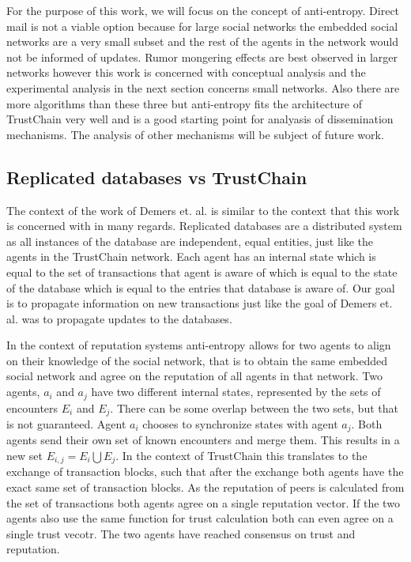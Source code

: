 For the purpose of this work, we will focus on the concept of anti-entropy. Direct mail is not a
viable option because for large social networks the embedded social networks are a very small 
subset and the rest of the agents in the network would not be informed of updates. Rumor mongering 
effects are best observed in larger networks however this work is concerned with conceptual analysis
and the experimental analysis in the next section concerns small networks. Also there are more 
algorithms than these three but anti-entropy fits the architecture of TrustChain very well and is 
a good starting point for analyasis of dissemination mechanisms. The analysis of other mechanisms
will be subject of future work.

\subsection{Replicated databases vs TrustChain}
The context of the work of Demers et. al. is similar to the context that this work is concerned with
in many regards. Replicated databases are a distributed system as all instances of the database are
independent, equal entities, just like the agents in the TrustChain network. Each agent has an 
internal state which is equal to the set of transactions that agent is aware of which is equal to
the state of the database which is equal to the entries that database is aware of. Our goal is to 
propagate information on new transactions just like the goal of Demers et. al. was to propagate 
updates to the databases. 

In the context of reputation systems anti-entropy allows for two agents to align on their knowledge
of the social network, that is to obtain the same embedded social network and agree on the reputation
of all agents in that network.
Two agents, $a_i$ and $a_j$ have two different internal states, represented by the sets of encounters
$E_i$ and $E_j$. There can be some overlap between the two sets, but that is not guaranteed. Agent 
$a_i$ chooses to synchronize states with agent $a_j$. Both agents send their own set of known 
encounters and merge them. This results in a new set $E_{i,j} = E_i \bigcup E_j$. In the context 
of TrustChain this translates to the exchange of transaction blocks, such that after the exchange 
both agents have the exact same set of transaction blocks. As the reputation of peers is calculated
from the set of transactions both agents agree on a single reputation vector. If the two agents also
use the same function for trust calculation both can even agree on a single trust vecotr. The two 
agents have reached consensus on trust and reputation. 

